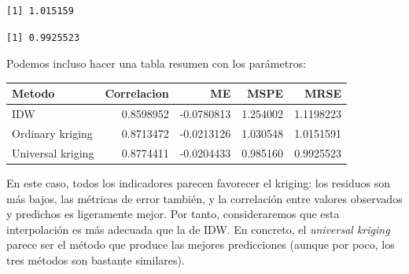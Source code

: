 \documentclass[
  letterpaper,
  DIV=11,
  numbers=noendperiod]{scrreprt}
\newenvironment{Shaded}{\begin{snugshade}}{\end{snugshade}}
\newcommand{\CommentTok}[1]{\textcolor[rgb]{0.37,0.37,0.37}{#1}}
\newcommand{\DecValTok}[1]{\textcolor[rgb]{0.68,0.00,0.00}{#1}}
\newcommand{\FunctionTok}[1]{\textcolor[rgb]{0.28,0.35,0.67}{#1}}
\newcommand{\NormalTok}[1]{\textcolor[rgb]{0.00,0.23,0.31}{#1}}
\newcommand{\SpecialCharTok}[1]{\textcolor[rgb]{0.37,0.37,0.37}{#1}}
\begin{document}
\begin{Shaded}
\end{Shaded}

\begin{verbatim}
[1] 1.015159
\end{verbatim}

\begin{Shaded}
\end{Shaded}

\begin{verbatim}
[1] 0.9925523
\end{verbatim}

Podemos incluso hacer una tabla resumen con los parámetros:

\begin{longtable}[]{@{}lrrrr@{}}
\toprule\noalign{}
Metodo & Correlacion & ME & MSPE & MRSE \\
\midrule\noalign{}
\endhead
\bottomrule\noalign{}
\endlastfoot
IDW & 0.8598952 & -0.0780813 & 1.254002 & 1.1198223 \\
Ordinary kriging & 0.8713472 & -0.0213126 & 1.030548 & 1.0151591 \\
Universal kriging & 0.8774411 & -0.0204433 & 0.985160 & 0.9925523 \\
\end{longtable}

En este caso, todos los indicadores parecen favorecer el kriging: los
residuos son más bajos, las métricas de error también, y la correlación
entre valores observados y predichos es ligeramente mejor. Por tanto,
consideraremos que esta interpolación es más adecuada que la de IDW. En
concreto, el \emph{universal kriging} parece ser el método que produce
las mejores predicciones (aunque por poco, los tres métodos son bastante
similares).
\end{document}
